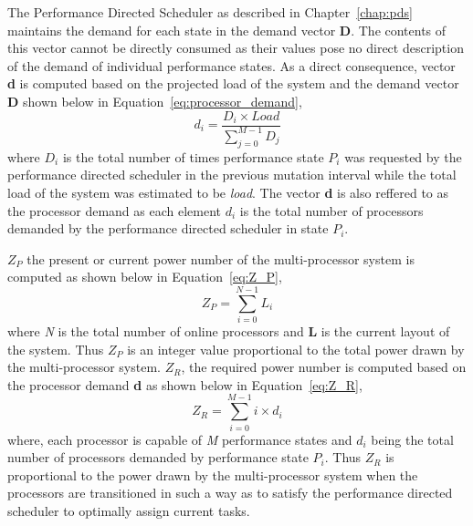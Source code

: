 The Performance Directed Scheduler as described in Chapter~\ref{chap:pds} maintains
the demand for each state in the demand vector \textbf{D}. The contents of this vector
cannot be directly consumed as their values pose no direct description of the demand 
of individual performance states. As a direct consequence, vector \textbf{d} is computed based 
on the projected load of the system and the demand vector \textbf{D} shown below in Equation~\eqref{eq:processor_demand},
\begin{equation}
    d_{i} = \frac{D_{i} \times Load}{\displaystyle\sum_{j=0}^{M-1} {D_{j}}}
\label{eq:processor_demand}
\end{equation}
where $D_i$ is the total number of times performance state $P_i$ was requested by the performance directed scheduler in 
the previous mutation interval while the total load of the system was estimated to be \textit{load}. The vector \textbf{d}
is also reffered to as the processor demand as each element $d_i$ is the total number of processors demanded by the 
performance directed scheduler in state $P_i$. 

$Z_P$ the present or current power number of the multi-processor system is computed as shown below in Equation~\eqref{eq:Z_P},
\begin{equation}
    Z_{P} = \displaystyle\sum_{i=0}^{N-1} {L_{i}} 
\label{eq:Z_P}
\end{equation}
where \textit{N} is the total number of online processors and \textbf{L} is the current layout of the system. Thus $Z_P$ 
is an integer value proportional to the total power drawn by the multi-processor system. $Z_R$, the required power number  is computed based on the 
processor demand \textbf{d} as shown below in Equation~\eqref{eq:Z_R},
\begin{equation}
    Z_{R} = \displaystyle\sum_{i=0}^{M-1} {i \times d_{i}} 
\label{eq:Z_R}
\end{equation}
where, each processor is capable of \textit{M} performance states and $d_i$ being the total number of processors demanded
by performance state $P_i$. Thus $Z_R$ is proportional to the power drawn by the multi-processor system when the processors
are transitioned in such a way as to satisfy the performance directed scheduler to optimally assign current tasks. 

